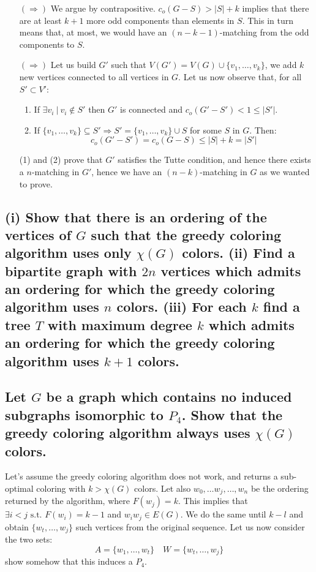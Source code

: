 \begin{itemize}
    \item[$(\Rightarrow)$] We argue by contrapositive.
        $c_o(G-S) > |S| + k$ implies that there are at least $k+1$ more odd components than elements in $S$.
        This in turn means that, at most, we would have an $(n - k -1)$-matching from the odd components to $S$.
    \item[$(\Rightarrow)$] Let us build $G'$ such that $V(G') = V(G) \cup \{v_1, \dots, v_k \}$, we add $k$ new vertices connected to all vertices in $G$.
        Let us now observe that, for all $S' \subset V'$:
        \begin{enumerate}
            \item If $\exists v_i \: | \: v_i \not\in S'$ then $G'$ is connected and $c_o(G' - S') < 1 \leq |S'|$.
            \item If $\{ v_1, \dots, v_k \} \subseteq S' \Rightarrow S' = \{v_1, \dots, v_k \} \cup S$ for some $S$ in $G$.
                Then:
                $$c_o(G' - S') = c_o(G - S) \leq |S| + k = |S'|$$
        \end{enumerate}
        (1) and (2) prove that $G'$ satisfies the Tutte condition, and hence there exists a $n$-matching in $G'$, hence we have an $(n-k)$-matching in $G$ as we wanted to prove.
\end{itemize}

\subsection[Matchings 7]{(i) Show that there is an ordering of the vertices of $G$ such that the greedy coloring algorithm uses only $\chi(G)$ colors. (ii) Find a bipartite graph with $2n$ vertices which admits an ordering for which the greedy coloring algorithm uses $n$ colors. (iii) For each $k$ find a tree $T$ with maximum degree $k$ which admits an ordering for which the greedy coloring algorithm uses $k+1$ colors.}

\subsection[Matchings 8]{Let $G$ be a graph which contains no induced subgraphs isomorphic to $P_4$. Show that the greedy coloring algorithm always uses $\chi(G)$ colors.}

Let's assume the greedy coloring algorithm does not work, and returns a sub-optimal coloring with $k > \chi(G)$ colors.
Let also $w_0, \dots w_j, \dots, w_n$ be the ordering returned by the algorithm, where $F(w_j) = k$.
This implies that $\exists i < j \text{ s.t. } F(w_i) = k - 1$ and $w_iw_j \in E(G)$.
We do the same until $k-l$ and obtain $\{ w_t, \dots, w_j\}$ such vertices from the original sequence.
Let us now consider the two sets:
$$A = \{w_1, \dots, w_t\} \quad W = \{ w_t, \dots, w_j\}$$
show somehow that this induces a $P_4$.

